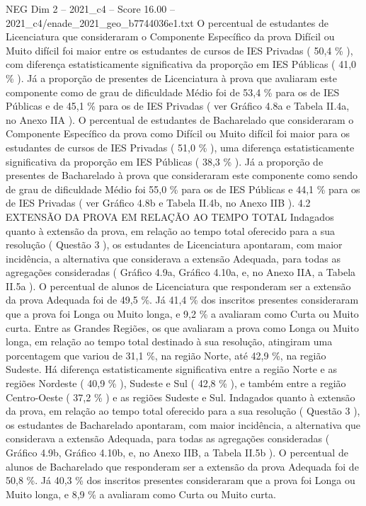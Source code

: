 \begin{textsample}{NEG Dim 2 – 2021\_c4 – Score 16.00 – 2021\_c4/enade\_2021\_geo\_b7744036e1.txt}
O percentual de estudantes de Licenciatura que consideraram o Componente Específico da prova Difícil ou Muito difícil foi maior entre os estudantes de cursos de IES Privadas ( 50,4 \% ), com diferença estatisticamente significativa da proporção em IES Públicas ( 41,0 \% ).
Já a proporção de presentes de Licenciatura à prova que avaliaram este componente como de grau de dificuldade Médio foi de 53,4 \% para os de IES Públicas e de 45,1 \% para os de IES Privadas ( ver Gráfico 4.8a e Tabela II.4a, no Anexo IIA ).
O percentual de estudantes de Bacharelado que consideraram o Componente Específico da prova como Difícil ou Muito difícil foi maior para os estudantes de cursos de IES Privadas ( 51,0 \% ), uma diferença estatisticamente significativa da proporção em IES Públicas ( 38,3 \% ).
Já a proporção de presentes de Bacharelado à prova que consideraram este componente como sendo de grau de dificuldade Médio foi 55,0 \% para os de IES Públicas e 44,1 \% para os de IES Privadas ( ver Gráfico 4.8b e Tabela II.4b, no Anexo IIB ). 4.2 EXTENSÃO DA PROVA EM RELAÇÃO AO TEMPO TOTAL Indagados quanto à extensão da prova, em relação ao tempo total oferecido para a sua resolução ( Questão 3 ), os estudantes de Licenciatura apontaram, com maior incidência, a alternativa que considerava a extensão Adequada, para todas as agregações consideradas ( Gráfico 4.9a, Gráfico 4.10a, e, no Anexo IIA, a Tabela II.5a ).
O percentual de alunos de Licenciatura que responderam ser a extensão da prova Adequada foi de 49,5 \%.
Já 41,4 \% dos inscritos presentes consideraram que a prova foi Longa ou Muito longa, e 9,2 \% a avaliaram como Curta ou Muito curta.
Entre as Grandes Regiões, os que avaliaram a prova como Longa ou Muito longa, em relação ao tempo total destinado à sua resolução, atingiram uma porcentagem que variou de 31,1 \%, na região Norte, até 42,9 \%, na região Sudeste.
Há diferença estatisticamente significativa entre a região Norte e as regiões Nordeste ( 40,9 \% ), Sudeste e Sul ( 42,8 \% ), e também entre a região Centro-Oeste ( 37,2 \% ) e as regiões Sudeste e Sul.
Indagados quanto à extensão da prova, em relação ao tempo total oferecido para a sua resolução ( Questão 3 ), os estudantes de Bacharelado apontaram, com maior incidência, a alternativa que considerava a extensão Adequada, para todas as agregações consideradas ( Gráfico 4.9b, Gráfico 4.10b, e, no Anexo IIB, a Tabela II.5b ).
O percentual de alunos de Bacharelado que responderam ser a extensão da prova Adequada foi de 50,8 \%.
Já 40,3 \% dos inscritos presentes consideraram que a prova foi Longa ou Muito longa, e 8,9 \% a avaliaram como Curta ou Muito curta.

\end{textsample}
